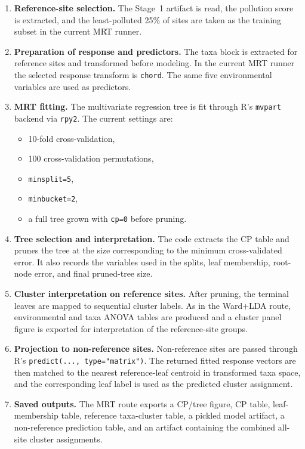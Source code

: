 \documentclass[11pt]{article}
\begin{document}
\begin{enumerate}[leftmargin=*]
  \item \textbf{Reference-site selection.}
  The Stage~1 artifact is read, the pollution score is extracted, and the least-polluted 25\% of sites are taken as the training subset in the current MRT runner.

  \item \textbf{Preparation of response and predictors.}
  The taxa block is extracted for reference sites and transformed before modeling. In the current MRT runner the selected response transform is \texttt{chord}. The same five environmental variables are used as predictors.

  \item \textbf{MRT fitting.}
  The multivariate regression tree is fit through R's \texttt{mvpart} backend via \texttt{rpy2}. The current settings are:
  \begin{itemize}[leftmargin=*]
    \item 10-fold cross-validation,
    \item 100 cross-validation permutations,
    \item \texttt{minsplit=5},
    \item \texttt{minbucket=2},
    \item a full tree grown with \texttt{cp=0} before pruning.
  \end{itemize}

  \item \textbf{Tree selection and interpretation.}
  The code extracts the CP table and prunes the tree at the size corresponding to the minimum cross-validated error. It also records the variables used in the splits, leaf membership, root-node error, and final pruned-tree size.

  \item \textbf{Cluster interpretation on reference sites.}
  After pruning, the terminal leaves are mapped to sequential cluster labels. As in the Ward+LDA route, environmental and taxa ANOVA tables are produced and a cluster panel figure is exported for interpretation of the reference-site groups.

  \item \textbf{Projection to non-reference sites.}
  Non-reference sites are passed through R's \texttt{predict(..., type="matrix")}. The returned fitted response vectors are then matched to the nearest reference-leaf centroid in transformed taxa space, and the corresponding leaf label is used as the predicted cluster assignment.

  \item \textbf{Saved outputs.}
  The MRT route exports a CP/tree figure, CP table, leaf-membership table, reference taxa-cluster table, a pickled model artifact, a non-reference prediction table, and an artifact containing the combined all-site cluster assignments.
\end{enumerate}
\end{document}
